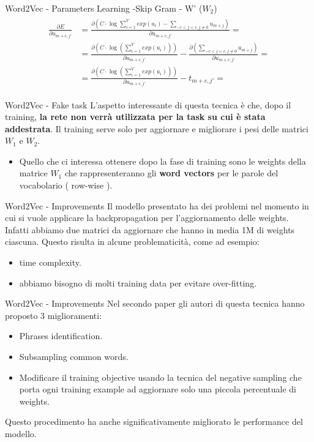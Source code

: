\documentclass[british]{beamer}
\begin{document}
\begin{frame}{Word2Vec - Parameters Learning -Skip Gram - W' (\(W_2\))}
	\begin{gather*}
		\begin{split}
		\frac{\partial E}{\partial u_{m+c,j'}} &= \frac{\partial \left( C \cdot \log \sum_{i=1}^{V} exp(u_i) - \sum_{-c<j<c,j\neq0} u_{m+j}\right)}{\partial u_{m+c, j'}} =
		\\
		&= \frac{\partial \left(C \cdot \log \left( \sum_{i=1}^{V} exp(u_i) \right)\right)}{\partial u_{m+c,j'}} - \frac{\partial \left( \sum_{-c<j<c,j\neq0} u_{m+j}\right)}{\partial u_{m+c,j'}}=
		\\
		&= \frac{\partial \left(C \cdot \log \left( \sum_{i=1}^{V} exp(u_i) \right)\right)}{\partial u_{m+c,j'}} - t_{m+c,j'}=
		\end{split}
	\end{gather*}
\end{frame}

\begin{frame}{Word2Vec - Fake task}
	L'aspetto interessante di questa tecnica \`{e} che, dopo il training, \textbf{la rete non verr\`{a} utilizzata per la task su cui \`{e} stata addestrata}. Il training serve solo per aggiornare e migliorare i pesi delle matrici \(W_1\) e \(W_2\).
	\begin{itemize}
		\item Quello che ci interessa ottenere dopo la fase di training sono le weights della matrice \(W_1\) che rappresenteranno gli \textbf{word vectors} per le parole del vocabolario ( row-wise ).
	\end{itemize}
\end{frame}

\begin{frame}{Word2Vec - Improvements}
	Il modello presentato ha dei problemi nel momento in cui si vuole applicare la backpropagation per l'aggiornamento delle weights.
	Infatti abbiamo due matrici da aggiornare che hanno in media 1M di weights ciascuna.
	Questo risulta in alcune problematicit\`{a}, come ad esempio:
	\begin{itemize}
		\item time complexity.
		\item abbiamo bisogno di molti training data per evitare over-fitting.
	\end{itemize}
\end{frame}
\begin{frame}{Word2Vec - Improvements}
	Nel secondo paper gli autori di questa tecnica hanno proposto 3 miglioramenti:
	\begin{itemize}
		\item Phrases identification.
		\item Subsampling common words.
		\item Modificare il training objective usando la tecnica del negative sampling che porta ogni training example ad aggiornare solo una piccola percentuale di weights.
	\end{itemize}
	Questo procedimento ha anche significativamente migliorato le performance del modello.
\end{frame}
\end{document}
